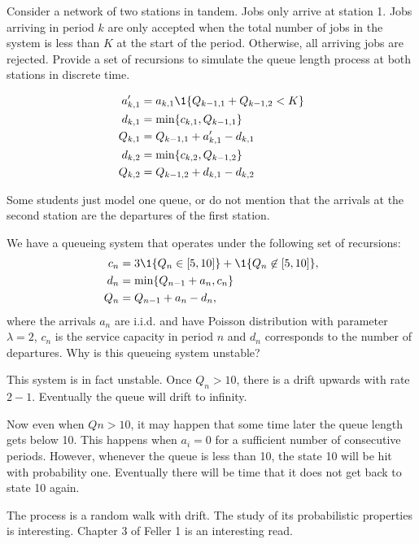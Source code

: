 \begin{exercise}[201807]
Consider a network of two stations in tandem. Jobs only arrive at station 1. Jobs arriving in period $k$ are only accepted  when the total number of jobs in the system is less than $K$ at the start of the period. Otherwise, all arriving jobs are rejected. Provide a set of recursions to simulate the queue length process at  both stations in discrete time. 

\begin{solution}
  \begin{align*}
a_{k,1}' &= a_{k,1}\1{Q_{k-1, 1} + Q_{k-1,2} < K} \\
    d_{k,1} &= \min\{c_{k,1}, Q_{k-1, 1}\} \\
    Q_{k,1} &= Q_{k-1,1} + a_{k,1}' - d_{k,1}\\
    d_{k,2} &= \min\{c_{k,2}, Q_{k-1, 2}\} \\
    Q_{k,2} &= Q_{k-1,2} + d_{k,1} - d_{k,2}\\
  \end{align*}

Some students just model one queue, or do not mention that the arrivals at the second station are the departures of the first station.
\end{solution}
\end{exercise}


\begin{exercise}[201807]
We have a queueing system that operates under the following set of recursions:
\begin{align*}
  c_n &= 3\1{Q_n \in [5, 10]} + \1{Q_n \not \in [5, 10]}, \\
d_n &= \min\{Q_{n-1}+a_n, c_n\} \\
Q_n &= Q_{n-1} + a_n - d_n,
\end{align*}
where the arrivals $a_n$ are i.i.d. and have Poisson distribution with parameter $\lambda=2$, $c_n$ is the service capacity in period $n$ and $d_n$ corresponds to the number of departures. Why is this queueing system unstable?
\begin{solution}
This system is in fact unstable. Once $Q_n > 10$, there is a drift upwards with rate $2-1$. Eventually the queue will drift to infinity. 

Now even when $Qn>10$, it may happen that some time later the queue length gets below 10. This happens when $a_i = 0$ for a sufficient number of consecutive periods. However, whenever the queue is less than 10, the state 10 will be hit with probability one. Eventually there will be time that it does not get back to state 10 again. 

The process is a random walk with drift. The study of its probabilistic properties is interesting. Chapter 3 of Feller 1 is an interesting read. 
\end{solution}
\end{exercise}


